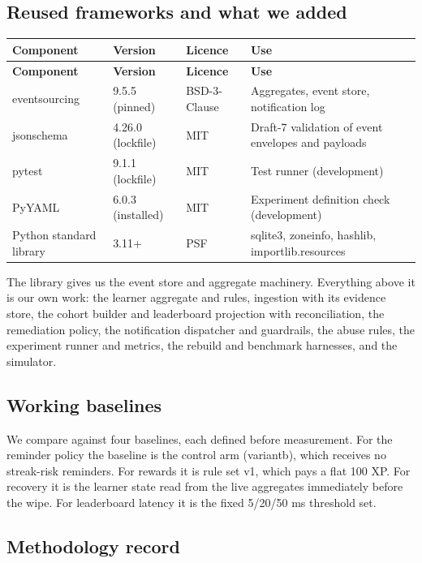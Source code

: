 \documentclass[11pt,a4paper]{article}
\newcommand{\hdr}[1]{\textbf{\color{white}\sffamily\small #1}}
\renewcommand{\_}{\textunderscore\allowbreak{}}
\begin{document}
\subsection{Reused frameworks and what we added}

\begin{xltabular}{\textwidth}{@{}L{3.7cm} L{2.2cm} L{2.4cm} Y@{}}
 \hdr{Component} & \hdr{Version} & \hdr{Licence} & \hdr{Use} \\
\endfirsthead
{} \hdr{Component} & \hdr{Version} & \hdr{Licence} & \hdr{Use} \\
\endhead
{} eventsourcing & 9.5.5 (pinned) & BSD-3-Clause & Aggregates, event store, notification log \\
jsonschema & 4.26.0 (lockfile) & MIT & Draft-7 validation of event envelopes and payloads \\
 pytest & 9.1.1 (lockfile) & MIT & Test runner (development) \\
PyYAML & 6.0.3 (installed) & MIT & Experiment definition check (development) \\
 Python standard library & 3.11+ & PSF & sqlite3, zoneinfo, hashlib, importlib.resources \\
\end{xltabular}

The library gives us the event store and aggregate machinery. Everything above it is our own work: the learner aggregate and rules, ingestion with its evidence store, the cohort builder and leaderboard projection with reconciliation, the remediation policy, the notification dispatcher and guardrails, the abuse rules, the experiment runner and metrics, the rebuild and benchmark harnesses, and the simulator.

\subsection{Working baselines}

We compare against four baselines, each defined before measurement. For the reminder policy the baseline is the control arm (variant\_b), which receives no streak-risk reminders. For rewards it is rule set v1, which pays a flat 100 XP. For recovery it is the learner state read from the live aggregates immediately before the wipe. For leaderboard latency it is the fixed 5/20/50 ms threshold set.

\subsection{Methodology record}
\label{sec:method}
\end{document}
